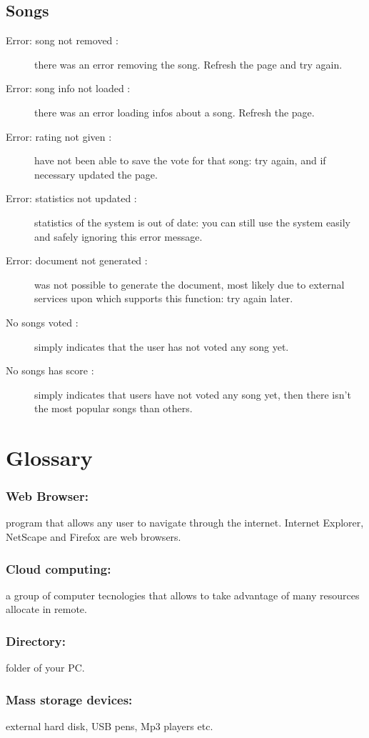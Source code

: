 \section{Songs}
\begin{description}
	\item[Error: song not removed :] there was an error removing the song.
	Refresh the page and try again.
	\item[Error: song info not loaded :] there was an error loading infos about a
	song. Refresh the page.
	\item[Error: rating not given :] have not been able to save the vote for that
	song: try again, and if necessary updated the page.
	\item[Error: statistics not updated :] statistics of the system is out of date:
	you can still use the system easily and safely ignoring this error message.
	\item[Error: document not generated :] was not possible to generate the
	document, most likely due to external services upon which supports this
	function: try again later.
	\item[No songs voted :] simply indicates that the user has not voted any song
	yet.
	\item[No songs has score :] simply indicates that users have not voted any song
	yet, then there isn't the most popular songs than others.
\end{description}

\chapter{Glossary}
\thispagestyle{fancy}

\subsection*{Web Browser:} program that allows any user to navigate through the
internet. Internet Explorer, NetScape and Firefox are web browsers. 
\subsection*{Cloud computing:} a group of computer tecnologies that allows to
take advantage of many resources allocate in remote. 
\subsection*{Directory:}
folder of your PC. 
\subsection*{Mass storage devices:} external hard disk, USB pens, Mp3 players
etc. 
